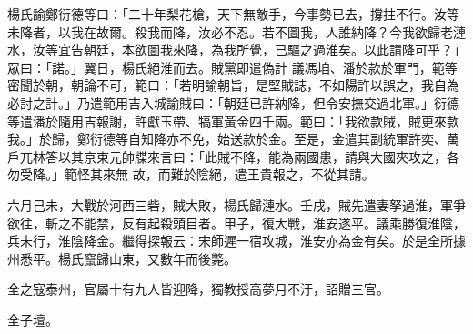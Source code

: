 \begin{pinyinscope}
 楊氏諭鄭衍德等曰：「二十年梨花槍，天下無敵手，今事勢已去，撐拄不行。汝等未降者，以我在故爾。殺我而降，汝必不忍。若不圖我，人誰納降？今我欲歸老漣水，汝等宜告朝廷，本欲圖我來降，為我所覺，已驅之過淮矣。以此請降可乎？」眾曰：「諾。」翼日，楊氏絕淮而去。賊黨即遣偽計
 議馮垍、潘於款於軍門，範等密聞於朝，朝論不可，範曰：「若明諭朝旨，是堅賊誌，不如陽許以誤之，我自為必討之計。」乃遣範用吉入城諭賊曰：「朝廷已許納降，但令安撫交過北軍。」衍德等遣潘於隨用吉報謝，許獻玉帶、犒軍黃金四千兩。範曰：「我欲款賊，賊更來款我。」於歸，鄭衍德等自知降亦不免，始送款於金。至是，金遣其副統軍許奕、萬戶兀林答以其京東元帥牒來言曰：「此賊不降，能為兩國患，請與大國夾攻之，各勿受降。」範怪其來無
 故，而難於陰絕，遣王貴報之，不從其請。



 六月己未，大戰於河西三砦，賊大敗，楊氏歸漣水。壬戌，賊先遣妻孥過淮，軍爭欲往，斬之不能禁，反有起殺頭目者。甲子，復大戰，淮安遂平。議乘勝復淮陰，兵未行，淮陰降金。繼得探報云：宋師遲一宿攻城，淮安亦為金有矣。於是全所據州悉平。楊氏竄歸山東，又數年而後斃。



 全之寇泰州，官屬十有九人皆迎降，獨教授高夢月不汙，詔贈三官。



 全子壇。



\end{pinyinscope}